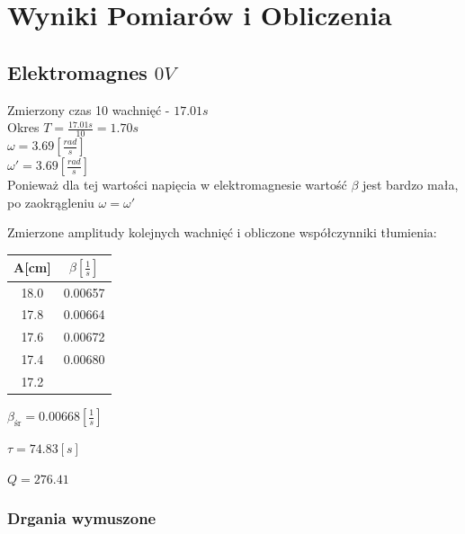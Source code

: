 \documentclass[]{article}
\begin{document}
	\section{Wyniki Pomiarów i  Obliczenia}
	\subsection{Elektromagnes $0V$}
	Zmierzony czas 10 wachnięć - $17.01s$\\
	Okres $T = \frac{17.01s}{10}=1.70s$\\
	$\omega = 3.69 \left[ \frac{rad}{s}\right]$\\
	$\omega' = 3.69 \left[ \frac{rad}{s}\right]$\\
	Ponieważ dla tej wartości napięcia w elektromagnesie wartość $\beta$ jest bardzo mała, po zaokrągleniu $\omega=\omega'$\\
	\pagebreak
	
	Zmierzone amplitudy kolejnych wachnięć i obliczone współczynniki tłumienia:
	\begin{table}[h]
		\begin{tabular}{|c|c|}
			\hline 
			A[cm] & $\beta\left[ \frac{1}{s}\right] $ \\ 
			\hline 
			18.0 & 0.00657 \\ 
			\hline 
			17.8 & 0.00664 \\ 
			\hline 
			17.6 & 0.00672 \\ 
			\hline 
			17.4 & 0.00680 \\ 
			\hline 
			17.2 &  \\ 
			\hline 
		\end{tabular} 
	\end{table}
	
	
	$\beta_{\text{śr}} = 0.00668 \left[ \frac{1}{s}\right] $
	
	$\tau=74.83[s]$
	
	$Q = 276.41$
	
	
	\subsubsection{Drgania wymuszone}
	
\end{document}
